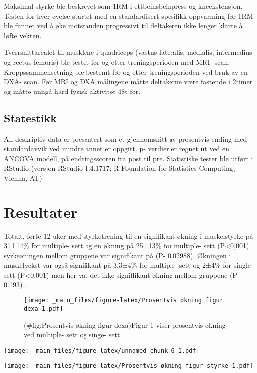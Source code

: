 \documentclass[
]{book}
\begin{document}
Maksimal styrke ble beskrevet som 1RM i ettbeinsbeinpress og kneekstensjon. Testen for hver øvelse startet med en standardisert spesifikk oppvarming før 1RM ble funnet ved å øke motstanden progressivt til deltakeren ikke lenger klarte å løfte vekten.

Tverrsnittarealet til musklene i quadriceps (vastus lateralis, medialis, intermedius og rectus femoris) ble testet før og etter treningsperioden med MRI- scan. Kroppssammensetning ble bestemt før og etter treningsperioden ved bruk av en DXA- scan. Før MRI og DXA målingene måtte deltakerne være fastende i 2timer og måtte unngå hard fysisk aktivitet 48t før. ~

\hypertarget{statestikk}{%
\subsection{Statestikk}\label{statestikk}}

All deskriptiv data er presentert som et gjennomsnitt av prosentvis ending med standardavvik ved mindre annet er oppgitt. p- verdier er regnet ut ved en ANCOVA modell, på endringsscoren fra post til pre. Statistiske tester ble utført i RStudio (versjon RStudio 1.4.1717; R Foundation for Statistics Computing, Vienna, AT)

\hypertarget{resultater}{%
\section{Resultater}\label{resultater}}

Totalt, førte 12 uker med styrketrening til en signifikant økning i muskelstyrke på 31±14\% for multiple- sett og en økning på 25±13\% for multiple- sett (P\textless0,001) syrkeøningen mellom gruppene var signifikant på (P- 0.02988). Økningen i muskelvekst var også signifikant på 3,3±4\% for multiple- sett og 2±4\% for single- sett (P\textless0,001) men her var det ikke signiffikant økning mellom gruppene (P- 0.193) .

\begin{figure}
\centering
\texttt{[image: \_main\_files/figure-latex/Prosentvis økning figur dexa-1.pdf]}
\caption{(\#fig:Prosentvis økning figur dexa)Figur 1 viser prosentvis økning ved multiple- sett og singe- sett}
\end{figure}

\texttt{[image: \_main\_files/figure-latex/unnamed-chunk-6-1.pdf]}

\texttt{[image: \_main\_files/figure-latex/Prosentvis økning figur styrke-1.pdf]}
\end{document}
